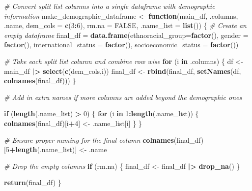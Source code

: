 \documentclass[
  twocolumn]{article}
\newenvironment{Shaded}{\begin{snugshade}}{\end{snugshade}}
\newcommand{\AttributeTok}[1]{\textcolor[rgb]{0.13,0.29,0.53}{#1}}
\newcommand{\CommentTok}[1]{\textcolor[rgb]{0.56,0.35,0.01}{\textit{#1}}}
\newcommand{\ConstantTok}[1]{\textcolor[rgb]{0.56,0.35,0.01}{#1}}
\newcommand{\ControlFlowTok}[1]{\textcolor[rgb]{0.13,0.29,0.53}{\textbf{#1}}}
\newcommand{\DecValTok}[1]{\textcolor[rgb]{0.00,0.00,0.81}{#1}}
\newcommand{\FunctionTok}[1]{\textcolor[rgb]{0.13,0.29,0.53}{\textbf{#1}}}
\newcommand{\NormalTok}[1]{#1}
\newcommand{\OtherTok}[1]{\textcolor[rgb]{0.56,0.35,0.01}{#1}}
\newcommand{\SpecialCharTok}[1]{\textcolor[rgb]{0.81,0.36,0.00}{\textbf{#1}}}
\begin{document}
\begin{Shaded}
\begin{Highlighting}[]
\CommentTok{\# Convert split list columns into a single dataframe with demographic information}
\NormalTok{make\_demographic\_dataframe }\OtherTok{\textless{}{-}} \ControlFlowTok{function}\NormalTok{(main\_df, .columns, .name, }\AttributeTok{dem\_cols =} \FunctionTok{c}\NormalTok{(}\DecValTok{3}\SpecialCharTok{:}\DecValTok{6}\NormalTok{), }\AttributeTok{rm.na =} \ConstantTok{FALSE}\NormalTok{, }\AttributeTok{.name\_list =} \FunctionTok{list}\NormalTok{()) \{}
  \CommentTok{\# Create an empty dataframe}
\NormalTok{  final\_df }\OtherTok{=} \FunctionTok{data.frame}\NormalTok{(}\AttributeTok{ethnoracial\_group=}\FunctionTok{factor}\NormalTok{(),}
                        \AttributeTok{gender =} \FunctionTok{factor}\NormalTok{(),}
                        \AttributeTok{international\_status =} \FunctionTok{factor}\NormalTok{(),}
                        \AttributeTok{socioeconomic\_status =} \FunctionTok{factor}\NormalTok{())}
  
  \CommentTok{\# Take each split list column and combine row wise}
  \ControlFlowTok{for}\NormalTok{ (i }\ControlFlowTok{in}\NormalTok{ .columns) \{}
\NormalTok{    df }\OtherTok{\textless{}{-}}\NormalTok{ main\_df }\SpecialCharTok{|\textgreater{}}
      \FunctionTok{select}\NormalTok{(}\FunctionTok{c}\NormalTok{(dem\_cols,i))}
\NormalTok{    final\_df }\OtherTok{\textless{}{-}} \FunctionTok{rbind}\NormalTok{(final\_df, }\FunctionTok{setNames}\NormalTok{(df, }\FunctionTok{colnames}\NormalTok{(final\_df)))}
\NormalTok{  \}}

  \CommentTok{\# Add in extra names if more columns are added beyond the demographic ones}
  
  \ControlFlowTok{if}\NormalTok{ (}\FunctionTok{length}\NormalTok{(.name\_list) }\SpecialCharTok{\textgreater{}} \DecValTok{0}\NormalTok{) \{}
    \ControlFlowTok{for}\NormalTok{ (i }\ControlFlowTok{in} \DecValTok{1}\SpecialCharTok{:}\FunctionTok{length}\NormalTok{(.name\_list)) \{}
      \FunctionTok{colnames}\NormalTok{(final\_df)[i}\SpecialCharTok{+}\DecValTok{4}\NormalTok{] }\OtherTok{\textless{}{-}}\NormalTok{ .name\_list[i]}
\NormalTok{    \}}
\NormalTok{  \}}
  
  \CommentTok{\# Ensure proper naming for the final column}
  \FunctionTok{colnames}\NormalTok{(final\_df)[}\DecValTok{5}\SpecialCharTok{+}\FunctionTok{length}\NormalTok{(.name\_list)] }\OtherTok{\textless{}{-}}\NormalTok{ .name}
  
  \CommentTok{\# Drop the empty columns}
  \ControlFlowTok{if}\NormalTok{ (rm.na) \{}
\NormalTok{    final\_df }\OtherTok{\textless{}{-}}\NormalTok{ final\_df }\SpecialCharTok{|\textgreater{}}
      \FunctionTok{drop\_na}\NormalTok{()}
\NormalTok{  \}}
  
  \FunctionTok{return}\NormalTok{(final\_df)}
\NormalTok{\}}
\end{Highlighting}
\end{Shaded}
\end{document}

